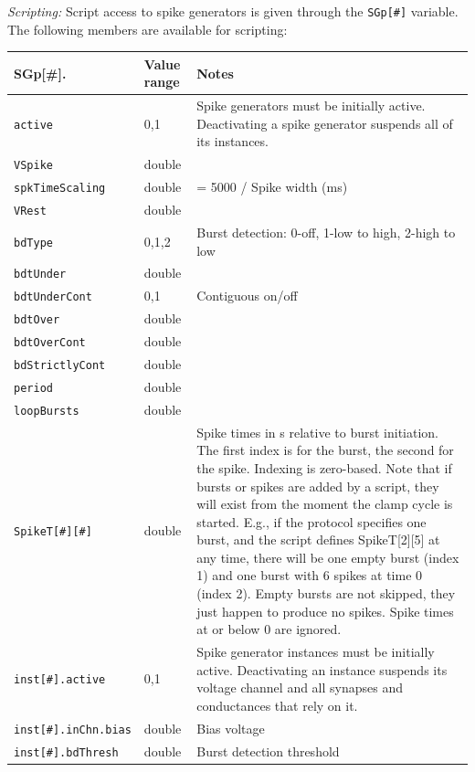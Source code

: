 \documentclass{article}
\begin{document}
\noindent
\emph{Scripting:} Script access to spike generators is given through the \texttt{SGp[\#]} variable.
The following members are available for scripting: \\
\begin{tabularx}{\linewidth}{|ll|X|}
	\hline
	{\bf SGp[\#].\textvisiblespace} & {\bf Value range} & {\bf Notes} \\
	\hline
	\texttt{active} & 0,1 & Spike generators must be initially active. Deactivating a spike generator
	suspends all of	its instances. \\
	\texttt{VSpike} & double & \\
	\texttt{spkTimeScaling} & double & = 5000 / Spike width (ms)\\
	\texttt{VRest} & double & \\
	\texttt{bdType} & 0,1,2 & Burst detection: 0-off, 1-low to high, 2-high to low \\
	\texttt{bdtUnder} & double & \\
	\texttt{bdtUnderCont} & 0,1 & Contiguous on/off \\
	\texttt{bdtOver} & double & \\
	\texttt{bdtOverCont} & double & \\
	\texttt{bdStrictlyCont} & double & \\
	\texttt{period} & double & \\
	\texttt{loopBursts} & double & \\
	\texttt{SpikeT[\#][\#]} & double & Spike times in s relative to burst initiation.
	 The first index is for the burst, the second for the spike. Indexing is zero-based.
	 Note that if bursts or spikes are added by a script, they will exist from the moment the clamp
	 cycle is started. E.g., if the protocol specifies one burst, and the script defines SpikeT[2][5]
	 at any time,
	 there will be one empty burst (index 1) and one burst with 6 spikes at time 0 (index 2). Empty
	 bursts are not skipped, they just happen to produce no spikes. Spike times at or below 0 are ignored. \\
	\texttt{inst[\#].active} & 0,1 & Spike generator instances must be initially active.
	 Deactivating an instance suspends its voltage channel and all synapses and conductances that rely on it. \\
	\texttt{inst[\#].inChn.bias} & double & Bias voltage \\
	\texttt{inst[\#].bdThresh} & double & Burst detection threshold \\
	\hline
\end{tabularx}
\end{document}
